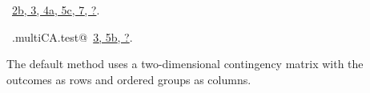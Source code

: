 \documentclass[reqno]{amsart}
\renewcommand{\NWlink}[2]{\hyperlink{#1}{#2}}
\begin{document}
\begin{flushleft}
\begin{list}{}{}
\mbox{}\verb@  }@\\
\mbox{}\verb@@\\
\mbox{}\verb@  df <- length(outcomes) - full@\\
\mbox{}\verb@  p.value <- pchisq(Tt, df=df, lower.tail=FALSE)@\\
\mbox{}\verb@@\\
\mbox{}\verb@  res <- list(statistic = Tt, parameter = df, p.value = p.value, @\\
\mbox{}\verb@              indiv.statistics = CAT, indiv.p.value = CAT.p.value)@\\
\mbox{}\verb@  return(res)@\\
\mbox{}\verb@}@\\
\mbox{}\verb@@{\NWsep}
\end{list}
\vspace{-1.5ex}
\footnotesize
\begin{list}{}{\setlength{\itemsep}{-\parsep}\setlength{\itemindent}{-\leftmargin}}
\item \NWtxtFileDefBy\ \NWlink{nuweb2b}{2b}\NWlink{nuweb3}{, 3}\NWlink{nuweb4a}{, 4a}\NWlink{nuweb5c}{, 5c}\NWlink{nuweb7}{, 7}\NWlink{nuweb?}{, ?}.
\item \NWtxtIdentsDefed\nobreak\  \verb@.multiCA.test@\nobreak\ \NWlink{nuweb3}{3}\NWlink{nuweb5b}{, 5b}\NWlink{nuweb?}{, ?}.
\item{}
\end{list}
\vspace{4ex}
\end{flushleft}
The default method uses a two-dimensional contingency matrix with the outcomes as rows and ordered groups as columns.
\end{document}
